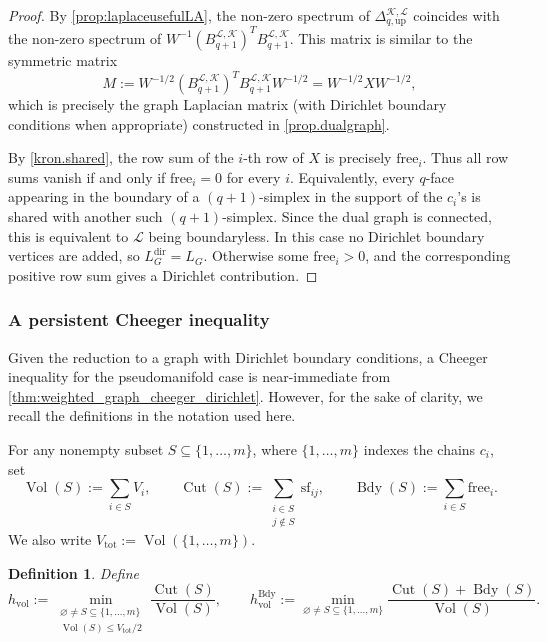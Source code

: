 \documentclass{article}
\newtheorem{definition}{Definition}[section]
\newcommand{\KK}{\mathcal{K}}
\newcommand{\LL}{\mathcal{L}}
\begin{document}
\begin{proof}
By \cref{prop:laplaceusefulLA}, the non-zero spectrum of $\Delta^{\KK,\LL}_{q,\mathrm{up}}$ coincides with the non-zero spectrum of
$
W^{-1} (B^{\LL, \KK}_{q+1})^T B^{\LL,\KK}_{q+1}.
$
This matrix is similar to the symmetric matrix
\[
M := W^{-1/2} (B^{\LL, \KK}_{q+1})^T B^{\LL, \KK}_{q+1} W^{-1/2} = W^{-1/2} X W^{-1/2},
\]
which is precisely the graph Laplacian matrix (with Dirichlet boundary conditions when appropriate) constructed in \cref{prop.dualgraph}.

By \cref{kron.shared}, the row sum of the \(i\)-th row of \(X\) is precisely \(\mathrm{free}_i\). Thus all row sums vanish if and only if \(\mathrm{free}_i=0\) for every \(i\). Equivalently, every \(q\)-face appearing in the boundary of a \((q+1)\)-simplex in the support of the \(c_i\)'s is shared with another such \((q+1)\)-simplex. Since the dual graph is connected, this is equivalent to \(\LL\) being boundaryless. In this case no Dirichlet boundary vertices are added, so \(L_G^{\mathrm{dir}}=L_G\). Otherwise some \(\mathrm{free}_i>0\), and the corresponding positive row sum gives a Dirichlet contribution.

\end{proof}

\subsubsection{A persistent Cheeger inequality}\label{sec:psd_mfld_cheeger_ineq}
Given the reduction to a graph with Dirichlet boundary conditions, a Cheeger inequality for the pseudomanifold case is near-immediate from \cref{thm:weighted_graph_cheeger_dirichlet}. However, for the sake of clarity, we recall the definitions in the notation used here.

For any nonempty subset \(S\subseteq \{1,\ldots,m\}\), where \(\{1,\ldots,m\}\) indexes the chains \(c_i\), set
\[
\operatorname{Vol}(S):=\sum_{i\in S}V_i,\qquad 
\operatorname{Cut}(S):=\sum_{\substack{i\in S\\ j\notin S}}\mathrm{sf}_{ij},\qquad 
\operatorname{Bdy}(S):=\sum_{i\in S}\mathrm{free}_i.
\]
We also write \(V_{\mathrm{tot}}:=\operatorname{Vol}(\{1,\ldots,m\})\).

\begin{definition}\label{def.cheeger.const}
Define
\[
h_{\mathrm{vol}}:= 
\min_{\substack{\varnothing\neq S\subseteq \{1,\ldots,m\}\\ \operatorname{Vol}(S)\leq V_{\mathrm{tot}}/2}} 
\frac{\operatorname{Cut}(S)}{\operatorname{Vol}(S)},
\qquad
h^{\mathrm{Bdy}}_{\mathrm{vol}}:= 
\min_{\varnothing\neq S\subseteq \{1,\ldots,m\}} 
\frac{\operatorname{Cut}(S)+\operatorname{Bdy}(S)}{\operatorname{Vol}(S)}.
\]
\end{definition}
\end{document}
